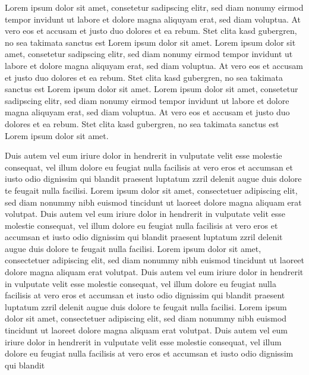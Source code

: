 \documentclass[a4paper,
	               twoside,
	               openright,
	               8pt,
	               final]
	               {memoir}
\begin{document}
	\begin{pairs}%
		\begin{Leftside}%
			\resumenumbering%
				\pstart%
Lorem ipsum dolor sit amet, consetetur sadipscing elitr, sed diam nonumy eirmod tempor invidunt ut
labore et dolore magna aliquyam erat, sed diam voluptua. At vero eos et accusam et justo duo
dolores et ea rebum. Stet clita kasd gubergren, no sea takimata sanctus est Lorem ipsum dolor sit
amet. Lorem ipsum dolor sit amet, consetetur sadipscing elitr, sed diam nonumy eirmod tempor
invidunt ut labore et dolore magna aliquyam erat, sed diam voluptua. At vero eos et accusam et
justo duo dolores et ea rebum. Stet clita kasd gubergren, no sea takimata sanctus est Lorem ipsum
dolor sit amet. Lorem ipsum dolor sit amet, consetetur sadipscing elitr, sed diam nonumy eirmod
tempor invidunt ut labore et dolore magna aliquyam erat, sed diam voluptua. At vero eos et accusam
et justo duo dolores et ea rebum. Stet clita kasd gubergren, no sea takimata sanctus est Lorem
ipsum dolor sit amet.
				\pend%
			\pausenumbering%
		\end{Leftside}%
		\begin{Rightside}%
			\resumenumbering%
				\pstart%
Duis autem vel eum iriure dolor in hendrerit in vulputate velit esse molestie consequat, vel illum
dolore eu feugiat nulla facilisis at vero eros et accumsan et iusto odio dignissim qui blandit
praesent luptatum zzril delenit augue duis dolore te feugait nulla facilisi. Lorem ipsum dolor sit
amet, consectetuer adipiscing elit, sed diam nonummy nibh euismod tincidunt ut laoreet dolore magna
aliquam erat volutpat.
Duis autem vel eum iriure dolor in hendrerit in vulputate velit esse molestie consequat, vel illum
dolore eu feugiat nulla facilisis at vero eros et accumsan et iusto odio dignissim qui blandit
praesent luptatum zzril delenit augue duis dolore te feugait nulla facilisi. Lorem ipsum dolor sit
amet, consectetuer adipiscing elit, sed diam nonummy nibh euismod tincidunt ut laoreet dolore magna
aliquam erat volutpat.
Duis autem vel eum iriure dolor in hendrerit in vulputate velit esse molestie consequat, vel illum
dolore eu feugiat nulla facilisis at vero eros et accumsan et iusto odio dignissim qui blandit
praesent luptatum zzril delenit augue duis dolore te feugait nulla facilisi. Lorem ipsum dolor sit
amet, consectetuer adipiscing elit, sed diam nonummy nibh euismod tincidunt ut laoreet dolore magna
aliquam erat volutpat.
Duis autem vel eum iriure dolor in hendrerit in vulputate velit esse molestie consequat, vel illum
dolore eu feugiat nulla facilisis at vero eros et accumsan et iusto odio dignissim qui blandit

\end{Rightside}
\end{pairs}
\end{document}
